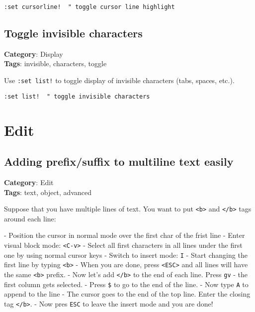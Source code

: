{{{\begin{Exa*}{}
\begin{Verbatim}[fontsize=\footnotesize, breaklines, breakanywhere]
:set cursorline!  " toggle cursor line highlight
\end{Verbatim}
\end{Exa*}

\section{Toggle invisible characters}

\textbf{Category}: Display\\ \textbf{Tags}: invisible, characters, toggle
\vspace{0.5cm}

Use {\footnotesize \Verb§:set list!§} to toggle display of invisible characters (tabs, spaces, etc.).

\begin{Exa*}{}
\begin{Verbatim}[fontsize=\footnotesize, breaklines, breakanywhere]
:set list!  " toggle invisible characters
\end{Verbatim}
\end{Exa*}

\chapter{Edit}
\section{Adding prefix/suffix to multiline text easily}

\textbf{Category}: Edit\\ \textbf{Tags}: text, object, advanced
\vspace{0.5cm}

Suppose that you have multiple lines of text. You want to put {\footnotesize \Verb§<b>§} and {\footnotesize \Verb§</b>§} tags around each line:

- Position the cursor in normal mode over the first char of the frist line
- Enter visual block mode: {\footnotesize \Verb§<C-v>§}
- Select all first characters in all lines under the first one by using normal cursor keys
- Switch to insert mode: {\footnotesize \Verb§I§}
- Start changing the first line by typing {\footnotesize \Verb§<b>§}
- When you are done, press {\footnotesize \Verb§<ESC>§} and all lines will have the same {\footnotesize \Verb§<b>§} prefix.
- Now let's add {\footnotesize \Verb§</b>§} to the end of each line. Press {\footnotesize \Verb§gv§} - the first column gets selected.
- Press {\footnotesize \Verb§$§} to go to the end of the line.
- Now type {\footnotesize \Verb§A§} to append to the line
- The cursor goes to the end of the top line. Enter the closing tag {\footnotesize \Verb§</b>§}.
- Now pres {\footnotesize \Verb§ESC§} to leave the insert mode and you are done!

}}}
